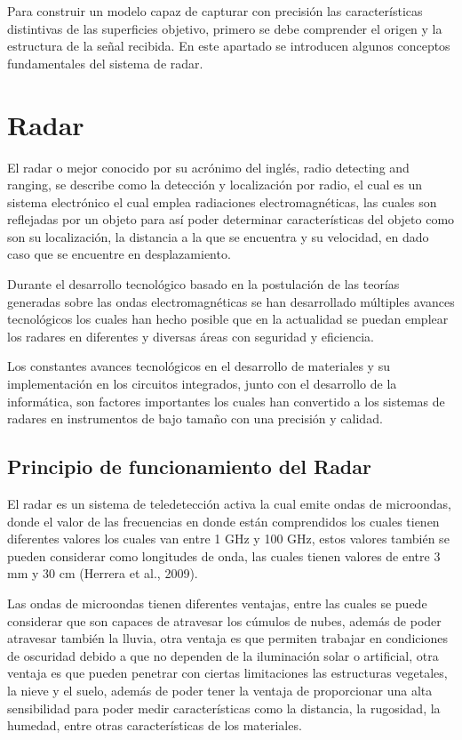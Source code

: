 
Para construir un modelo capaz de capturar con precisión las características distintivas de las superficies objetivo, primero se debe comprender el origen y la estructura de la señal recibida. En este apartado se introducen algunos conceptos fundamentales del sistema de radar. 

\section{Radar}

El radar o mejor conocido por su acrónimo del inglés, radio detecting and ranging, se describe como la detección y localización por radio, el cual es un sistema electrónico el cual emplea radiaciones electromagnéticas, las cuales son reflejadas por un objeto para así poder determinar características del objeto como son su localización, la distancia a la que se encuentra y su velocidad, en dado caso que se encuentre en desplazamiento. \cite{AlonsoCerpa}

Durante el desarrollo tecnológico basado en la postulación de las teorías generadas sobre las ondas electromagnéticas se han desarrollado múltiples avances tecnológicos los cuales han hecho posible que en la actualidad se puedan emplear los radares en diferentes y diversas áreas con seguridad y eficiencia. 

Los constantes avances tecnológicos en el desarrollo de materiales y su implementación en los circuitos integrados, junto con el desarrollo de la informática, son factores importantes los cuales han convertido a los sistemas de radares en instrumentos de bajo tamaño con una precisión y calidad. 

\subsection{Principio de funcionamiento del Radar}

El radar es un sistema de teledetección activa la cual emite ondas de microondas, donde el valor de las frecuencias en donde están comprendidos los cuales tienen diferentes valores los cuales van entre 1 GHz y 100 GHz, estos valores también se pueden considerar como longitudes de onda, las cuales tienen valores de entre 3 mm y 30 cm (Herrera et al., 2009). 

Las ondas de microondas tienen diferentes ventajas, entre las cuales se puede considerar que son capaces de atravesar los cúmulos de nubes, además de poder atravesar también la lluvia, otra ventaja es que permiten trabajar en condiciones de oscuridad debido a que no dependen de la iluminación solar o artificial, otra ventaja es que pueden penetrar con ciertas limitaciones las estructuras vegetales, la nieve y el suelo, además de poder tener la ventaja de proporcionar una alta sensibilidad para poder medir características como la distancia, la rugosidad, la humedad, entre otras características de los materiales. 

